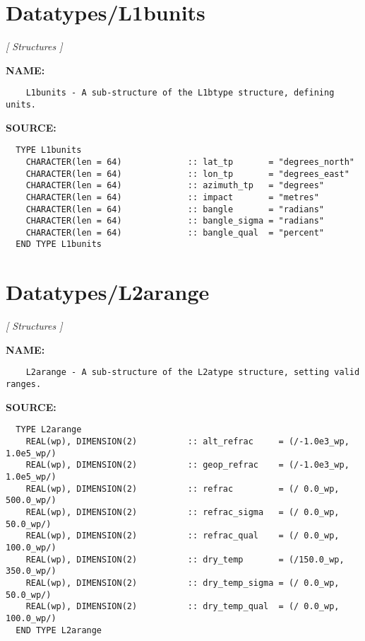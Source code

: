\section{Datatypes/L1bunits}
\textsl{[ Structures ]}

\label{ch:robo36}
\label{ch:Datatypes_L1bunits}
\textbf{NAME:}\hspace{0.08in}\begin{Verbatim}
    L1bunits - A sub-structure of the L1btype structure, defining units.
\end{Verbatim}
\textbf{SOURCE:}\hspace{0.08in}\begin{Verbatim}
  TYPE L1bunits
    CHARACTER(len = 64)             :: lat_tp       = "degrees_north"
    CHARACTER(len = 64)             :: lon_tp       = "degrees_east"
    CHARACTER(len = 64)             :: azimuth_tp   = "degrees"
    CHARACTER(len = 64)             :: impact       = "metres"
    CHARACTER(len = 64)             :: bangle       = "radians"
    CHARACTER(len = 64)             :: bangle_sigma = "radians"
    CHARACTER(len = 64)             :: bangle_qual  = "percent"
  END TYPE L1bunits
\end{Verbatim}
\section{Datatypes/L2arange}
\textsl{[ Structures ]}

\label{ch:robo37}
\label{ch:Datatypes_L2arange}
\textbf{NAME:}\hspace{0.08in}\begin{Verbatim}
    L2arange - A sub-structure of the L2atype structure, setting valid ranges.
\end{Verbatim}
\textbf{SOURCE:}\hspace{0.08in}\begin{Verbatim}
  TYPE L2arange
    REAL(wp), DIMENSION(2)          :: alt_refrac     = (/-1.0e3_wp, 1.0e5_wp/)
    REAL(wp), DIMENSION(2)          :: geop_refrac    = (/-1.0e3_wp, 1.0e5_wp/)
    REAL(wp), DIMENSION(2)          :: refrac         = (/ 0.0_wp, 500.0_wp/)
    REAL(wp), DIMENSION(2)          :: refrac_sigma   = (/ 0.0_wp,  50.0_wp/)
    REAL(wp), DIMENSION(2)          :: refrac_qual    = (/ 0.0_wp, 100.0_wp/)
    REAL(wp), DIMENSION(2)          :: dry_temp       = (/150.0_wp, 350.0_wp/)
    REAL(wp), DIMENSION(2)          :: dry_temp_sigma = (/ 0.0_wp,  50.0_wp/)
    REAL(wp), DIMENSION(2)          :: dry_temp_qual  = (/ 0.0_wp, 100.0_wp/)
  END TYPE L2arange
\end{Verbatim}
